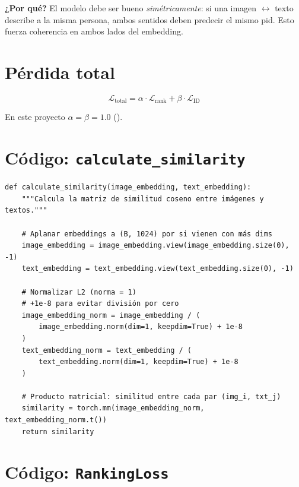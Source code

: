 \noindent\textbf{¿Por qué?} El modelo debe ser bueno
\emph{simétricamente}: si una imagen $\leftrightarrow$ texto
describe a la misma persona, ambos sentidos deben predecir el
mismo pid. Esto fuerza coherencia en ambos lados del embedding.

\section{Pérdida total}

\begin{equation}
  \mathcal{L}_{\text{total}} = \alpha \cdot \mathcal{L}_{\text{rank}}
                             + \beta  \cdot \mathcal{L}_{\text{ID}}
\end{equation}

\noindent En este proyecto $\alpha = \beta = 1.0$
().

\section{Código: \texttt{calculate\_similarity}}

\begin{verbatim}
def calculate_similarity(image_embedding, text_embedding):
    """Calcula la matriz de similitud coseno entre imágenes y textos."""

    # Aplanar embeddings a (B, 1024) por si vienen con más dims
    image_embedding = image_embedding.view(image_embedding.size(0), -1)
    text_embedding = text_embedding.view(text_embedding.size(0), -1)

    # Normalizar L2 (norma = 1)
    # +1e-8 para evitar división por cero
    image_embedding_norm = image_embedding / (
        image_embedding.norm(dim=1, keepdim=True) + 1e-8
    )
    text_embedding_norm = text_embedding / (
        text_embedding.norm(dim=1, keepdim=True) + 1e-8
    )

    # Producto matricial: similitud entre cada par (img_i, txt_j)
    similarity = torch.mm(image_embedding_norm, text_embedding_norm.t())
    return similarity
\end{verbatim}

\section{Código: \texttt{RankingLoss}}

